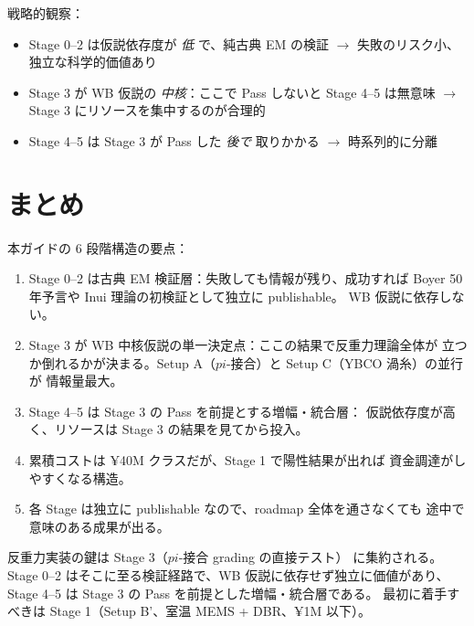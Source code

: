 \documentclass[11pt,a4paper]{article}
\def\pi{pi}%
\def\textbf#1{#1}%
\begin{document}
\textbf{戦略的観察}：
\begin{itemize}
\item Stage 0--2 は仮説依存度が \emph{低} で、純古典 EM の検証
  $\to$ \textbf{失敗のリスク小、独立な科学的価値あり}
\item Stage 3 が WB 仮説の \emph{中核}：ここで Pass しないと Stage 4--5 は無意味
  $\to$ \textbf{Stage 3 にリソースを集中するのが合理的}
\item Stage 4--5 は Stage 3 が Pass した \emph{後で} 取りかかる
  $\to$ \textbf{時系列的に分離}
\end{itemize}

\section{まとめ}

本ガイドの 6 段階構造の要点：

\begin{enumerate}
\item \textbf{Stage 0--2 は古典 EM 検証層}：失敗しても情報が残り、成功すれば
  Boyer 50 年予言や Inui 理論の初検証として独立に publishable。
  WB 仮説に依存しない。
\item \textbf{Stage 3 が WB 中核仮説の単一決定点}：ここの結果で反重力理論全体が
  立つか倒れるかが決まる。Setup A（$\pi$-接合）と Setup C（YBCO 渦糸）の並行が
  情報量最大。
\item \textbf{Stage 4--5 は Stage 3 の Pass を前提とする増幅・統合層}：
  仮説依存度が高く、リソースは Stage 3 の結果を見てから投入。
\item \textbf{累積コストは ¥40M クラス}だが、Stage 1 で陽性結果が出れば
  資金調達がしやすくなる構造。
\item \textbf{各 Stage は独立に publishable} なので、roadmap 全体を通さなくても
  途中で意味のある成果が出る。
\end{enumerate}

\begin{tcolorbox}[colback=green!5,colframe=green!50!black,title=本ガイドの一行まとめ]
反重力実装の鍵は \textbf{Stage 3（$\pi$-接合 grading の直接テスト）} に集約される。
Stage 0--2 はそこに至る検証経路で、WB 仮説に依存せず独立に価値があり、
Stage 4--5 は Stage 3 の Pass を前提とした増幅・統合層である。
最初に着手すべきは Stage 1（Setup B'、室温 MEMS + DBR、¥1M 以下）。
\end{tcolorbox}
\end{document}
